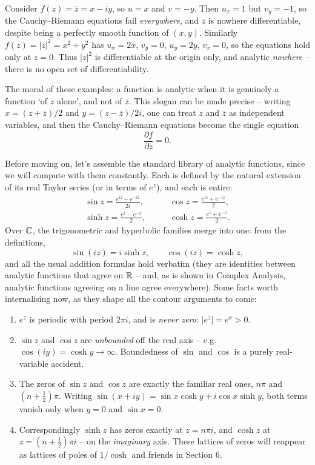 \documentclass[a4paper]{scrartcl}
\begin{document}
\begin{example}
	Consider $f(z) = \overline{z} = x - iy$, so $u = x$ and $v = -y$. Then $u_x = 1$ but $v_y = -1$, so the Cauchy--Riemann equations fail \emph{everywhere}, and $\overline{z}$ is nowhere differentiable, despite being a perfectly smooth function of $(x,y)$. Similarly $f(z) = |z|^2 = x^2 + y^2$ has $u_x = 2x$, $v_y = 0$, $u_y = 2y$, $v_x = 0$, so the equations hold only at $z = 0$. Thus $|z|^2$ is differentiable at the origin only, and analytic \emph{nowhere} -- there is no open set of differentiability.
\end{example}

The moral of these examples: a function is analytic when it is genuinely a function `of $z$ alone', and not of $\overline{z}$. This slogan can be made precise -- writing $x = (z + \overline z)/2$ and $y = (z - \overline z)/2i$, one can treat $z$ and $\overline{z}$ as independent variables, and then the Cauchy--Riemann equations become the single equation
$$
\frac{\partial f}{\partial \overline{z}} = 0.
$$

Before moving on, let's assemble the standard library of analytic functions, since we will compute with them constantly. Each is defined by the natural extension of its real Taylor series (or in terms of $e^z$), and each is entire:
\begin{align*}
	\sin z = \frac{e^{iz} - e^{-iz}}{2i}, &\qquad \cos z = \frac{e^{iz} + e^{-iz}}{2}, \\
	\sinh z = \frac{e^{z} - e^{-z}}{2}, &\qquad \cosh z = \frac{e^{z} + e^{-z}}{2}.
\end{align*}
Over $\mathbb{C}$, the trigonometric and hyperbolic families merge into one: from the definitions,
$$
\sin(iz) = i \sinh z, \qquad \cos(iz) = \cosh z,
$$
and all the usual addition formulas hold verbatim (they are identities between analytic functions that agree on $\mathbb{R}$ -- and, as is shown in Complex Analysis, analytic functions agreeing on a line agree everywhere). Some facts worth internalising now, as they shape all the contour arguments to come:

\begin{enumerate}[label=(\roman*)]
	\item $e^z$ is periodic with period $2\pi i$, and is \emph{never zero}: $|e^z| = e^x > 0$.
	\item $\sin z$ and $\cos z$ are \emph{unbounded} off the real axis -- e.g.\ $\cos(iy) = \cosh y \to \infty$. Boundedness of $\sin$ and $\cos$ is a purely real-variable accident.
	\item The zeros of $\sin z$ and $\cos z$ are exactly the familiar real ones, $n\pi$ and $(n + \frac 12)\pi$. Writing $\sin(x + iy) = \sin x \cosh y + i \cos x \sinh y$, both terms vanish only when $y = 0$ and $\sin x = 0$.
	\item Correspondingly $\sinh z$ has zeros exactly at $z = n\pi i$, and $\cosh z$ at $z = \left(n + \frac 12\right)\pi i$ -- on the \emph{imaginary} axis. These lattices of zeros will reappear as lattices of poles of $1/\cosh$ and friends in Section 6.
\end{enumerate}
\end{document}
